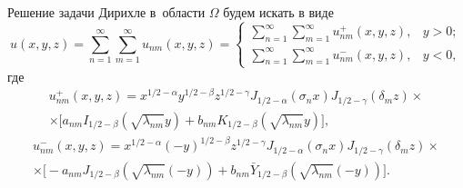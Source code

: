 Решение задачи Дирихле в~области $\Omega $ будем искать в виде
\begin{equation}
u(x,y,z)=\sum\limits_{n=1}^\infty
\sum\limits_{m=1}^\infty u_{nm}(x,y,z)
=\left\{ \begin{array}{ll}
\sum\limits _{n=1}^\infty 
\sum\limits _{m=1}^\infty u^{+}_{nm}(x,y,z) , &y > 0;
\\[2mm]
\sum\limits _{n=1}^\infty
\sum\limits _{m=1}^\infty   u^{-}_{nm}(x,y,z) 
, &y < 0,
 \end{array} \right.
\label{eq:k36}
\end{equation}
где 
\begin{multline}
u^{+}_{nm}(x,y,z) =
x^{ 1/2 -\alpha}y^{ 1/2 -\beta}z^{ 1/2 -\gamma} J_{ 1/2 -\alpha}(\sigma_n x)J_{ 1/2 -\gamma}(\delta_m z)\times 
\\
\times
\bigl[a_{nm}I_{ 1/2 -\beta}(\sqrt{\lambda_{nm}}y)+b_{nm}K_{ 1/2 -\beta}(\sqrt{\lambda_{nm}}y)\bigr],
\end{multline}
\begin{multline}
u^{-}_{nm}(x,y,z) =
x^{ 1/2 -\alpha}(-y)^{ 1/2 -\beta}z^{ 1/2 -\gamma}J_{ 1/2 -\alpha}(\sigma_n x)J_{ 1/2 -\gamma}(\delta_m z)\times
\\
\times\bigl[-a_{nm}J_{ 1/2 -\beta}(\sqrt{\lambda_{nm}}(-y))+b_{nm}\bar Y_{ 1/2 -\beta}(\sqrt{\lambda_{nm}}(-y))\bigr].
\end{multline}


